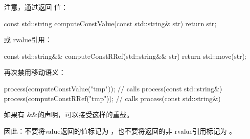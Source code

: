 注意，通过返回  值：

\begin{cppcode}
const std::string computeConstValue(const std::string& str) {
	return str;
}
\end{cppcode}

或  rvalue引用：

\begin{cppcode}
const std::string&& computeConstRRef(std::string&& str) {
	return std::move(str);
}
\end{cppcode}

再次禁用移动语义：

\begin{cppcode}
process(computeConstValue("tmp")); // calls process(const std::string&)
process(computeConstRRef("tmp")); // calls process(const std::string&)
\end{cppcode}

如果有 \&\&的声明，可以接受这样的重载。

因此：不要将value返回的值标记为 ，也不要将返回的非  rvalue引用标记为 。



